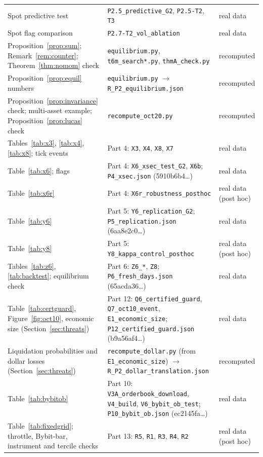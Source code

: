 \begin{longtable}{p{}p{}p{}}
Spot predictive test & \texttt{P2.5\_predictive\_G2}, \texttt{P2.5-T2}, \texttt{T3} & real data\\
Spot flag comparison & \texttt{P2.7-T2\_vol\_ablation} & real data\\
Proposition~\ref{prop:sum}; Remark~\ref{rem:counter}; Theorem~\ref{thm:nomom} check & \texttt{equilibrium.py}, \texttt{t6m\_search*.py}, \texttt{thmA\_check.py} & recomputed\\
Proposition~\ref{prop:equil} numbers & \texttt{equilibrium.py} $\to$ \texttt{R\_P2\_equilibrium.json} & recomputed\\
Proposition~\ref{prop:invariance} check; multi-asset example; Proposition~\ref{prop:lucas} check & \texttt{recompute\_oct20.py} & recomputed\\
Tables~\ref{tab:x3}, \ref{tab:x4}, \ref{tab:x8}; tick events & Part 4: \texttt{X3}, \texttt{X4}, \texttt{X8}, \texttt{X7} & real data\\
Table~\ref{tab:x6}; flags & Part 4: \texttt{X6\_xsec\_test\_G2}, \texttt{X6b}; \texttt{P4\_xsec.json} (5910b6b4\ldots) & real data\\
Table~\ref{tab:x6r} & Part 4: \texttt{X6r\_robustness\_posthoc} & real data (post hoc)\\
Table~\ref{tab:y6} & Part 5: \texttt{Y6\_replication\_G2}; \texttt{P5\_replication.json} (6aa8e2c0\ldots) & real data\\
Table~\ref{tab:y8} & Part 5: \texttt{Y8\_kappa\_control\_posthoc} & real data (post hoc)\\
Tables~\ref{tab:z6}, \ref{tab:backtest}; equilibrium check & Part 6: \texttt{Z6\_*}, \texttt{Z8}; \texttt{P6\_fresh\_days.json} (65acda36\ldots) & real data\\
Table~\ref{tab:certguard}, Figure~\ref{fig:oct10}, economic size (Section~\ref{sec:threats}) & Part 12: \texttt{Q6\_certified\_guard}, \texttt{Q7\_oct10\_event}, \texttt{E1\_economic\_size}; \texttt{P12\_certified\_guard.json} (b9a56af4\ldots) & real data\\
Liquidation probabilities and dollar losses (Section~\ref{sec:threats}) & \texttt{recompute\_dollar.py} (from \texttt{E1\_economic\_size}) $\to$ \texttt{R\_P2\_dollar\_translation.json} & recomputed\\
Table~\ref{tab:bybitob} & Part 10: \texttt{V3A\_orderbook\_download}, \texttt{V4\_build}, \texttt{V6\_bybit\_ob\_test}; \texttt{P10\_bybit\_ob.json} (ec2145fa\ldots) & real data\\
Table~\ref{tab:fixedgrid}; throttle, Bybit-bar, instrument and tercile checks & Part 13: \texttt{R5}, \texttt{R1}, \texttt{R3}, \texttt{R4}, \texttt{R2} & real data (post hoc)\\

\end{longtable}
